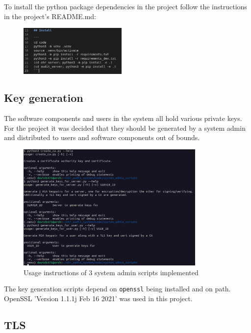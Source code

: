 \documentclass[11pt]{article}
\begin{document}
\begin{flushleft}
To install the python package dependencies in the project follow the instructions in the project's README.md:

\begin{figure}[h!]
	\begin{center}
		\includegraphics[width = 200px]{images/readme_md.png}
	\end{center}
\end{figure}


\subsection{Key generation}

The software components and users in the system all hold various private keys. For the project it was decided that they should be generated by a system admin and distributed to users and software components out of bounds.

\newpage

\begin{figure}[h!]
	\begin{center}
		\includegraphics[width = 350px]{images/system_admin_scripts.png}
		\caption{Usage instructions of 3 system admin scripts implemented}
	\end{center}
\end{figure}

The key generation scripts depend on \verb+openssl+ being installed and on path. OpenSSL 'Version 1.1.1j  Feb 16 2021' was used in this project.

\subsection{TLS}


\end{flushleft}
\end{document}
